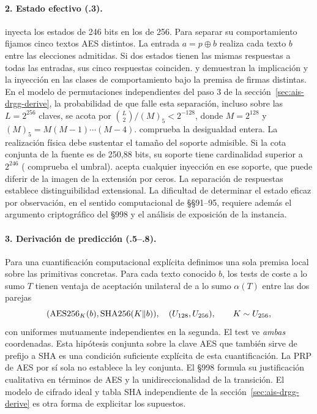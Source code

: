 \paragraph{2. Estado efectivo (.3).}
 inyecta los estados de 246 bits en los de 256.
Para separar su comportamiento fijamos cinco textos AES distintos.
La entrada \(a=p\oplus b\) realiza cada texto \(b\) entre las elecciones
admitidas. Si dos estados tienen las mismas respuestas a todas las entradas,
sus cinco respuestas coinciden.  y
 demuestran la implicación y la inyección en las
clases de comportamiento bajo la premisa de firmas distintas. En el modelo
de permutaciones independientes del paso 3 de la sección~\ref{sec:ais-drgg-derive},
la probabilidad de que falle esta separación, incluso sobre las
\(L=2^{256}\) claves, se acota por \(\binom{L}{2}/(M)_5<2^{-128}\), donde
\(M=2^{128}\) y \((M)_5=M(M-1)\cdots(M-4)\).
 comprueba la desigualdad entera.
La realización física debe sustentar el tamaño del soporte admisible. Si la
cota conjunta de la fuente es de 250,88 bits, su soporte tiene cardinalidad
superior a \(2^{246}\) ( comprueba el umbral).
 acepta cualquier inyección en ese soporte, que
puede diferir de la imagen de la extensión por ceros.
La separación de respuestas establece distinguibilidad extensional.
La dificultad de determinar el estado eficaz por observación, en el
sentido computacional de §§91--95, requiere además el argumento
criptográfico del §998 y el análisis de exposición de la instancia.

\paragraph{3. Derivación de predicción (.5--.8).}
Para una cuantificación computacional explícita definimos una sola
premisa local sobre las primitivas concretas. Para cada texto conocido
\(b\), los tests de coste a lo sumo \(T\) tienen ventaja de aceptación
unilateral de a lo sumo \(\alpha(T)\) entre las dos parejas
\[
  (\operatorname{AES256}_K(b),\operatorname{SHA256}(K\|b)),\quad (U_{128},U_{256}),\qquad K\sim U_{256},
\]
con uniformes mutuamente independientes en la segunda. El test ve
\emph{ambas} coordenadas. Esta hipótesis conjunta sobre la clave AES que
también sirve de prefijo a SHA es una condición suficiente explícita
de esta cuantificación. La PRP de AES por sí sola no establece la ley
conjunta. El §998 formula su justificación cualitativa en términos de AES
y la unidireccionalidad de la transición. El modelo de cifrado ideal y tabla
SHA independiente de la sección~\ref{sec:ais-drgg-derive} es otra forma de
explicitar los supuestos.

